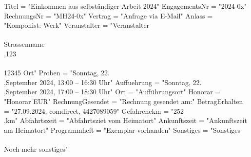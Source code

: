 \documentclass[11pt,a4paper,DIV=10]{scrartcl}
\begin{document}
\begin{luacode}
    Titel = "Einkommen aus selbständiger Arbeit 2024"
    EngagementsNr = "2024-0x"
    RechnungsNr = "MH24-0x"
    Vertrag = "Anfrage via E-Mail"
    Anlass = "Komponist: Werk"
    Veranstalter = "Veranstalter\\\\Strassenname\\,123\\\\12345 Ort"
    Proben = "Sonntag, 22.\\,September 2024, 13:00 -- 16:30 Uhr"
    Auffuehrung = "Sonntag, 22.\\,September 2024, 17:00 -- 18:30 Uhr"
    Ort = "Aufführungsort"
    Honorar = "Honorar EUR"
    RechnungGesendet = "Rechnung gesendet am:"
    BetragErhalten = "27.09.2024, comdirect, 4427089059"
    Gefahrenekm = "252\\,km"
    Abfahrtszeit = "Abfahrtsziet vom Heimatort"
    Ankunftszeit = "Ankunftszeit am Heimatort"
    Programmheft = "Exemplar vorhanden"
    Sonstiges = "Sonstiges\\\\Noch mehr sonstiges"
\end{luacode}


\textbf{\Large{}}\\[20pt]
\end{document}
